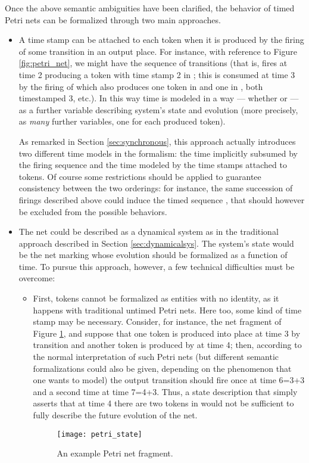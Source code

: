 Once the above semantic ambiguities have been clarified, the behavior 
of timed Petri nets can be formalized through two main approaches. 

\begin{itemize}
\item A time stamp can be attached to each token when it is produced 
by the firing of some transition in an output place. For instance, 
with reference to Figure \ref{fig:petri_net}, we might have the sequence of
transitions 
(that is,  fires at time 2 producing a token with 
time stamp 2 in ; this is consumed at time 3 by the firing 
of  which also produces one token in  and 
one in , both timestamped 3, etc.). In this way time is 
 modeled in a  way --- whether  or  
--- as a further variable describing system's state and evolution 
(more precisely, as \emph{many} further variables, one for each 
produced token).

As remarked in Section \ref{sec:synchronous}, this approach actually introduces 
two different time models in the formalism: the time implicitly 
subsumed by the firing sequence and the time modeled by the time 
stamps attached to tokens. Of course some restrictions should 
be applied to guarantee consistency between the two orderings: 
for instance, the same succession of firings described above could induce the timed 
sequence ,
that should however be excluded from the possible behaviors. 

\item The net could be described as a dynamical system as in the traditional 
approach described in Section \ref{sec:dynamicalsys}. The system's state would be 
the net marking whose evolution should be formalized as a function 
of time. To pursue this approach, however, a few technical difficulties 
must be overcome:
  \begin{itemize}
  \item First, tokens cannot be formalized as entities with no identity, 
	 as it happens with traditional untimed Petri nets. Here too, 
	 some kind of time stamp may be necessary. Consider, for instance, 
	 the net fragment of Figure \ref{fig:petri_state}, and suppose that one token is 
	 produced into place  at time 3 by transition  and another 
	 token is produced by  at time 4; then, according to the normal 
	 interpretation of such Petri nets (but different semantic formalizations 
	 could also be given, depending on the phenomenon that one wants 
	 to model) the output transition  should fire once at time 6=3+3 
	 and a second time at time 7=4+3. Thus, a state description that 
	 simply asserts that at time 4 there are two tokens in  would 
	 not be sufficient to fully describe the future evolution of the 
	 net.
\begin{figure}[htb!]
	 \centering
	 \texttt{[image: petri\_state]}
	 \caption{An example Petri net fragment.}
	 \label{fig:petri_state}
\end{figure}


\end{itemize}
\end{itemize}

